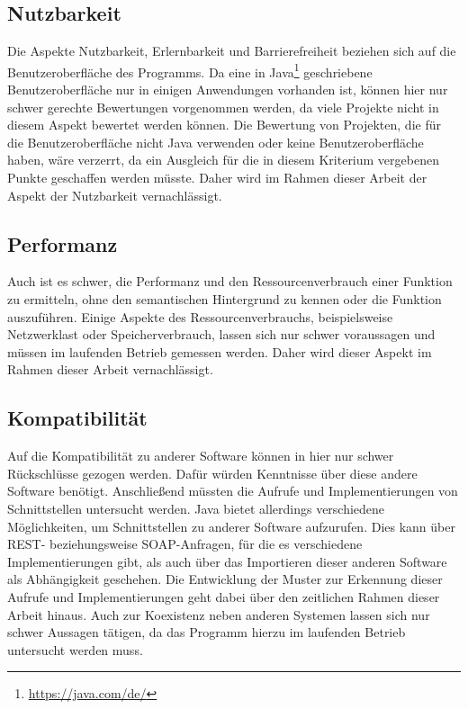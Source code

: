 \documentclass[
	oneside,  %
	ngerman, 
	final, 
	11pt, 
	a4paper, 
	1.1headlines, 
	headinclude=false, 
	footinclude=false, 
	mpinclude=false, 
	pagesize, 
	onecolumn, 
	titlepage, 
	parskip=half, 
	headsepline, 
	chapterprefix=false, 
	version=first, 
	listof=totoc, 
	bibliography=totoc, 
	toc=graduated, 
	fleqn
]{scrbook}
\begin{document}
\subsection{Nutzbarkeit}
Die Aspekte Nutzbarkeit, Erlernbarkeit und Barrierefreiheit beziehen sich auf die Benutzeroberfläche des Programms.
Da eine in Java\footnote{\url{https://java.com/de/}} geschriebene Benutzeroberfläche nur in einigen Anwendungen vorhanden ist, können hier nur schwer gerechte Bewertungen vorgenommen werden, da viele Projekte nicht in diesem Aspekt bewertet werden können.
Die Bewertung von Projekten, die für die Benutzeroberfläche nicht Java verwenden oder keine Benutzeroberfläche haben, wäre verzerrt, da ein Ausgleich für die in diesem Kriterium vergebenen Punkte geschaffen werden müsste.
Daher wird im Rahmen dieser Arbeit der Aspekt der Nutzbarkeit vernachlässigt.

\subsection{Performanz}
Auch ist es schwer, die Performanz und den Ressourcenverbrauch einer Funktion zu ermitteln, ohne den semantischen Hintergrund zu kennen oder die Funktion auszuführen.
Einige Aspekte des Ressourcenverbrauchs, beispielsweise Netzwerklast oder Speicherverbrauch, lassen sich nur schwer voraussagen und müssen im laufenden Betrieb gemessen werden.
Daher wird dieser Aspekt im Rahmen dieser Arbeit vernachlässigt.

\subsection{Kompatibilität}
Auf die Kompatibilität zu anderer Software können in hier nur schwer Rückschlüsse gezogen werden.
Dafür würden Kenntnisse über diese andere Software benötigt.
Anschließend müssten die Aufrufe und Implementierungen von Schnittstellen untersucht werden.
Java bietet allerdings verschiedene Möglichkeiten, um Schnittstellen zu anderer Software aufzurufen.
Dies kann über \acf{REST}- beziehungsweise \acf{SOAP}-Anfragen, für die es verschiedene Implementierungen gibt, als auch über das Importieren dieser anderen Software als Abhängigkeit geschehen.
Die Entwicklung der Muster zur Erkennung dieser Aufrufe und Implementierungen geht dabei über den zeitlichen Rahmen dieser Arbeit hinaus.
Auch zur Koexistenz neben anderen Systemen lassen sich nur schwer Aussagen tätigen, da das Programm hierzu im laufenden Betrieb untersucht werden muss.
\end{document}
